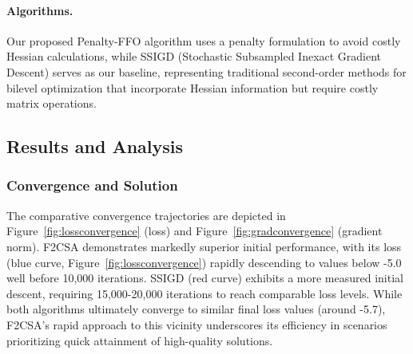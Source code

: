 \documentclass[letterpaper]{article} %
\newcommand{\1}{\mathbf{1}}
\begin{document}
\paragraph{Algorithms.} Our proposed Penalty-FFO algorithm uses a penalty formulation to avoid costly Hessian calculations, while SSIGD (Stochastic Subsampled Inexact Gradient Descent) serves as our baseline, representing traditional second-order methods for bilevel optimization that incorporate Hessian information but require costly matrix operations.

\subsection{Results and Analysis}
\subsubsection{Convergence and Solution}
The comparative convergence trajectories are depicted in Figure~\ref{fig:lossconvergence} (loss) and Figure~\ref{fig:gradconvergence} (gradient norm). F2CSA demonstrates markedly superior initial performance, with its loss (blue curve, Figure~\ref{fig:lossconvergence}) rapidly descending to values below -5.0 well before 10,000 iterations. SSIGD (red curve) exhibits a more measured initial descent, requiring 15,000-20,000 iterations to reach comparable loss levels. While both algorithms ultimately converge to similar final loss values (around -5.7), F2CSA's rapid approach to this vicinity underscores its efficiency in scenarios prioritizing quick attainment of high-quality solutions.

\end{document}
